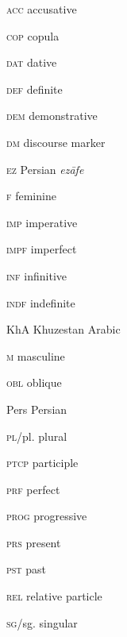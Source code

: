 \documentclass[output=paper,nonflat]{langsci/langscibook}
\begin{document}
\begin{multicols}{2}

\textsc{acc}  accusative

\textsc{cop}  copula

\textsc{dat}  dative

\textsc{def}  definite

\textsc{dem}  demonstrative

\textsc{dm}  discourse marker

\textsc{ez} Persian \textit{ezāfe}

\textsc{f}  feminine

\textsc{imp}   imperative

\textsc{impf}  imperfect

\textsc{inf}  infinitive

\textsc{indf}  indefinite

KhA  Khuzestan Arabic

\textsc{m}  masculine

\textsc{obl}  oblique

Pers  Persian

\textsc{pl}/pl.  plural

\textsc{ptcp}  participle

\textsc{prf}  perfect

\textsc{prog}  progressive

\textsc{prs}  present

\textsc{pst}  past

\textsc{rel}  relative particle

\textsc{sg}/sg.  singular

\end{multicols}



\sloppy\printbibliography[heading=subbibliography,notkeyword=this]
\end{document}
